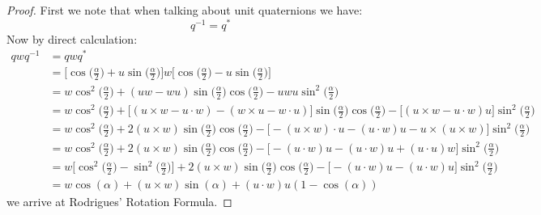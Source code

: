 \documentclass[12pt, letterpaper, onecolumn, conference, final]{IEEEtran}
\theoremstyle{definition}
\newtheorem{proposition}{Proposition}
\theoremstyle{plain}
\begin{document}
\newpage
\begin{center}
\end{center}

\begin{proof}
First we note that when talking about unit quaternions we have:
\begin{equation*}
q^{-1} = q^*
\end{equation*}
Now by direct calculation:
\begin{equation*}
\begin{split}
qwq^{-1} &= qwq^* \\
&= \Bigg[ \cos\Big( \frac{\alpha}{2} \Big) + u\sin\Big( \frac{\alpha}{2} \Big) \Bigg] w \Bigg[ \cos\Big( \frac{\alpha}{2} \Big) - u\sin\Big( \frac{\alpha}{2} \Big) \Bigg] \\
&= w\cos^2\Big( \frac{\alpha}{2} \Big) + (uw - wu)\sin\Big( \frac{\alpha}{2} \Big)\cos\Big( \frac{\alpha}{2} \Big) - uwu\sin^2\Big( \frac{\alpha}{2} \Big) \\
&= w\cos^2\Big( \frac{\alpha}{2} \Big) + \Big[ (u \times w - u \cdot w) - (w \times u - w \cdot u) \Big]\sin\Big( \frac{\alpha}{2} \Big)\cos\Big( \frac{\alpha}{2} \Big) - \Big[ (u \times w - u \cdot w)u \Big]\sin^2\Big( \frac{\alpha}{2} \Big) \\
&= w\cos^2\Big( \frac{\alpha}{2} \Big) + 2(u \times w)\sin\Big( \frac{\alpha}{2} \Big)\cos\Big( \frac{\alpha}{2} \Big) - \Big[ -(u \times w) \cdot u - (u \cdot w)u - u \times (u \times w) \Big]\sin^2\Big( \frac{\alpha}{2} \Big) \\
&= w\cos^2\Big( \frac{\alpha}{2} \Big) + 2(u \times w)\sin\Big( \frac{\alpha}{2} \Big)\cos\Big( \frac{\alpha}{2} \Big) - \Big[ -(u \cdot w)u - (u \cdot w)u + (u \cdot u)w \Big]\sin^2\Big( \frac{\alpha}{2} \Big) \\
&= w\Bigg[ \cos^2\Big( \frac{\alpha}{2} \Big) - \sin^2\Big( \frac{\alpha}{2} \Big) \Bigg] + 2(u \times w)\sin\Big( \frac{\alpha}{2} \Big)\cos\Big( \frac{\alpha}{2} \Big) - \Big[ -(u \cdot w)u - (u \cdot w)u \Big]\sin^2\Big( \frac{\alpha}{2} \Big) \\
&= w\cos(\alpha) + (u \times w)\sin(\alpha) + (u \cdot w)u(1 - \cos(\alpha))
\end{split}
\end{equation*}
we arrive at Rodrigues' Rotation Formula.
\end{proof}
\end{document}
